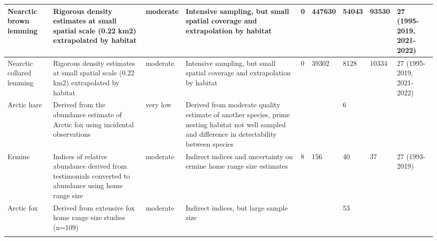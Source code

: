 \begin{longtable}{|p{}|p{}|p{}|p{}|p{}|p{}|p{}|p{}|p{}|}
   \hline
Nearctic brown lemming & Rigorous density estimates at small spatial scale (0.22 km2) extrapolated by habitat & moderate & Intensive sampling, but small spatial coverage and extrapolation by habitat &   0 & 447630 & 54043 & 93530 & 27 (1995-2019, 2021-2022) \\ 
   \hline
Nearctic collared lemming & Rigorous density estimates at small spatial scale (0.22 km2) extrapolated by habitat & moderate & Intensive sampling, but small spatial coverage and extrapolation by habitat &   0 & 39302 & 8128 & 10334 & 27 (1995-2019, 2021-2022) \\ 
   \hline
Arctic hare & Derived from the abundance estimate of Arctic fox using incidental observations & very low & Derived from moderate quality estimate of another species, prime nesting habitat not well sampled and difference in detectability between species &  &  & 6 &  &  \\ 
   \hline
Ermine & Indices of relative abundance derived from testimonials converted to abundance using home range size & moderate & Indirect indices and uncertainty on ermine home range size estimates &   8 & 156 & 40 & 37 & 27 (1993-2019) \\ 
   \hline
Arctic fox & Derived from extensive fox home range size studies (n=109) & moderate & Indirect indices, but large sample size &  &  & 53 &  &  \\ 
   \hline
\hline
\label{table:table_summary_methods_and_abundance}
\end{longtable}
\endgroup
